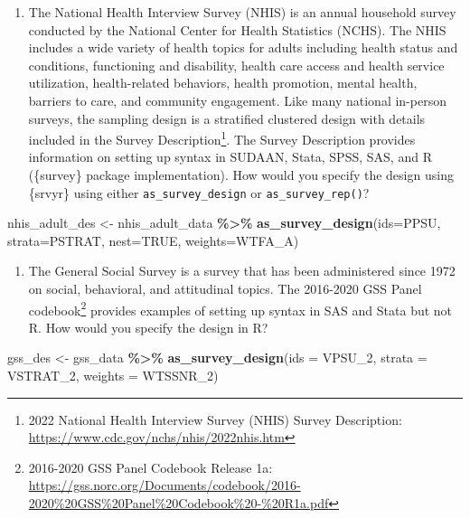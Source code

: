\documentclass[
]{krantz}
\makeatletter
\newenvironment{Shaded}{\begin{snugshade}}{\end{snugshade}}
\newcommand{\AttributeTok}[1]{\textcolor[rgb]{0.27,0.27,0.27}{#1}}
\newcommand{\ConstantTok}[1]{\textcolor[rgb]{0.37,0.37,0.37}{#1}}
\newcommand{\FunctionTok}[1]{\textcolor[rgb]{0.27,0.27,0.27}{\textbf{#1}}}
\newcommand{\NormalTok}[1]{#1}
\newcommand{\OtherTok}[1]{\textcolor[rgb]{0.37,0.37,0.37}{#1}}
\newcommand{\SpecialCharTok}[1]{\textcolor[rgb]{0.43,0.43,0.43}{\textbf{#1}}}
\providecommand{\tightlist}{%
  \setlength{\itemsep}{0pt}\setlength{\parskip}{0pt}}
\newenvironment{kframe}{%
\medskip{}
\setlength{\fboxsep}{.8em}
 \def\at@end@of@kframe{}%
 \ifinner\ifhmode%
  \def\at@end@of@kframe{\end{minipage}}%
  \begin{minipage}{\columnwidth}%
 \fi\fi%
 \def\FrameCommand##1{\hskip\@totalleftmargin \hskip-\fboxsep
 \colorbox{shadecolor}{##1}\hskip-\fboxsep
     \hskip-\linewidth \hskip-\@totalleftmargin \hskip\columnwidth}%
 \MakeFramed {\advance\hsize-\width
   \@totalleftmargin\z@ \linewidth\hsize
   \@setminipage}}%
 {\par\unskip\endMakeFramed%
 \at@end@of@kframe}
\renewenvironment{Shaded}{\begin{kframe}}{\end{kframe}}
\makeatother
\begin{document}
\begin{enumerate}
\def\labelenumi{\arabic{enumi}.}
\tightlist
\item
  The National Health Interview Survey (NHIS) is an annual household survey conducted by the National Center for Health Statistics (NCHS). The NHIS includes a wide variety of health topics for adults including health status and conditions, functioning and disability, health care access and health service utilization, health-related behaviors, health promotion, mental health, barriers to care, and community engagement. Like many national in-person surveys, the sampling design is a stratified clustered design with details included in the Survey Description\footnote{2022 National Health Interview Survey (NHIS) Survey Description: \url{https://www.cdc.gov/nchs/nhis/2022nhis.htm}}. The Survey Description provides information on setting up syntax in SUDAAN, Stata, SPSS, SAS, and R (\{survey\} package implementation). How would you specify the design using \{srvyr\} using either \texttt{as\_survey\_design} or \texttt{as\_survey\_rep()}?
\end{enumerate}

\begin{Shaded}
\begin{Highlighting}[]
\NormalTok{nhis\_adult\_des }\OtherTok{\textless{}{-}}\NormalTok{ nhis\_adult\_data }\SpecialCharTok{\%\textgreater{}\%}
  \FunctionTok{as\_survey\_design}\NormalTok{(}\AttributeTok{ids=}\NormalTok{PPSU, }
  \AttributeTok{strata=}\NormalTok{PSTRAT, }
  \AttributeTok{nest=}\ConstantTok{TRUE}\NormalTok{, }
  \AttributeTok{weights=}\NormalTok{WTFA\_A)}
\end{Highlighting}
\end{Shaded}

\begin{enumerate}
\def\labelenumi{\arabic{enumi}.}
\setcounter{enumi}{1}
\tightlist
\item
  The General Social Survey is a survey that has been administered since 1972 on social, behavioral, and attitudinal topics. The 2016-2020 GSS Panel codebook\footnote{2016-2020 GSS Panel Codebook Release 1a: \url{https://gss.norc.org/Documents/codebook/2016-2020\%20GSS\%20Panel\%20Codebook\%20-\%20R1a.pdf}} provides examples of setting up syntax in SAS and Stata but not R. How would you specify the design in R?
\end{enumerate}

\begin{Shaded}
\begin{Highlighting}[]
\NormalTok{gss\_des }\OtherTok{\textless{}{-}}\NormalTok{ gss\_data }\SpecialCharTok{\%\textgreater{}\%}
  \FunctionTok{as\_survey\_design}\NormalTok{(}\AttributeTok{ids =}\NormalTok{ VPSU\_2,}
                   \AttributeTok{strata =}\NormalTok{ VSTRAT\_2,}
                   \AttributeTok{weights =}\NormalTok{ WTSSNR\_2)}
\end{Highlighting}
\end{Shaded}
\end{document}
